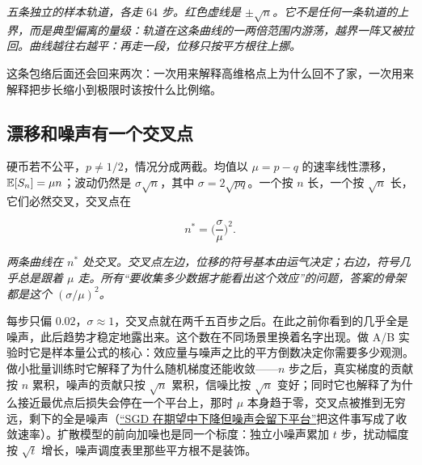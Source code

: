 \begin{center}
\emph{五条独立的样本轨道，各走 \(64\) 步。红色虚线是 \(\pm\sqrt n\)。它不是任何一条轨道的上界，而是典型偏离的量级：轨道在这条曲线的一两倍范围内游荡，越界一阵又被拉回。曲线越往右越平：再走一段，位移只按平方根往上挪。}
\end{center}

这条包络后面还会回来两次：一次用来解释高维格点上为什么回不了家，一次用来解释把步长缩小到极限时该按什么比例缩。

\subsection{漂移和噪声有一个交叉点}

硬币若不公平，\(p\neq 1/2\)，情况分成两截。均值以 \(\mu=p-q\) 的速率线性漂移，\(\mathbb{E}[S_n]=\mu n\)；波动仍然是 \(\sigma\sqrt n\)，其中 \(\sigma=2\sqrt{pq}\)。一个按 \(n\) 长，一个按 \(\sqrt n\) 长，它们必然交叉，交叉点在

\[
n^\ast=\Big(\frac{\sigma}{\mu}\Big)^{2}.
\]

\begin{center}

\emph{两条曲线在 \(n^\ast\) 处交叉。交叉点左边，位移的符号基本由运气决定；右边，符号几乎总是跟着 \(\mu\) 走。所有``要收集多少数据才能看出这个效应''的问题，答案的骨架都是这个 \((\sigma/\mu)^2\)。}
\end{center}

每步只偏 \(0.02\)，\(\sigma\approx1\)，交叉点就在两千五百步之后。在此之前你看到的几乎全是噪声，此后趋势才稳定地露出来。这个数在不同场景里换着名字出现。做 A/B 实验时它是样本量公式的核心：效应量与噪声之比的平方倒数决定你需要多少观测。做小批量训练时它解释了为什么随机梯度还能收敛——\(n\) 步之后，真实梯度的贡献按 \(n\) 累积，噪声的贡献只按 \(\sqrt n\) 累积，信噪比按 \(\sqrt n\) 变好；同时它也解释了为什么接近最优点后损失会停在一个平台上，那时 \(\mu\) 本身趋于零，交叉点被推到无穷远，剩下的全是噪声（\hyperref[sec:09-Convex-Optimization/08-Nonconvex-and-Stochastic-Optimization/04]{``SGD 在期望中下降但噪声会留下平台''}把这件事写成了收敛速率）。扩散模型的前向加噪也是同一个标度：独立小噪声累加 \(t\) 步，扰动幅度按 \(\sqrt t\) 增长，噪声调度表里那些平方根不是装饰。

